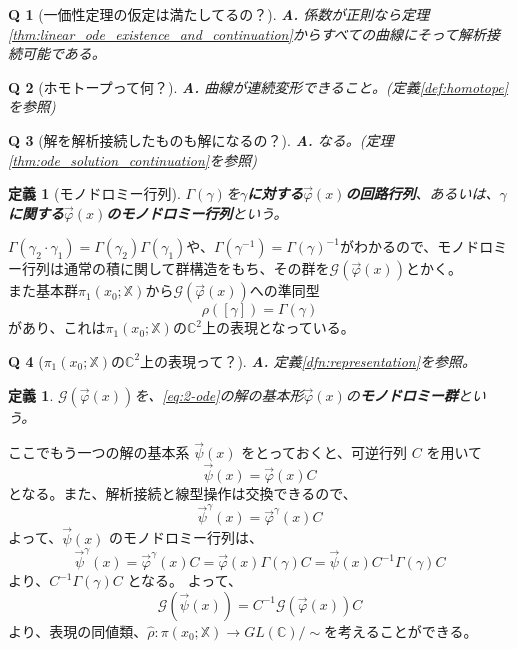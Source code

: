 \documentclass[paper=a4, fontsize=11pt]{jlreq} %
\theoremstyle{break}
\newtheorem{definition}[theorem]{定義}
\theoremstyle{qa}
\newtheorem*{Q}{Q}
\theoremstyle{remark} %
\begin{document}
\begin{Q}[一価性定理の仮定は満たしてるの？]
\textbf{A.} 係数が正則なら定理\ref{thm:linear_ode_existence_and_continuation}からすべての曲線にそって解析接続可能である。\\
\end{Q}

\begin{Q}[ホモトープって何？]
\textbf{A.} 曲線が連続変形できること。(定義\ref{def:homotope}を参照)\\
\end{Q}

\begin{Q}[解を解析接続したものも解になるの？]
\textbf{A.} なる。(定理\ref{thm:ode_solution_continuation}を参照)\\
\end{Q}

\begin{definition}[モノドロミー行列]
    $\Gamma(\gamma)$を\textbf{$\gamma$に対する$\vec{\varphi}(x)$の回路行列}、あるいは、\textbf{$\gamma$に関する$\vec{\varphi}(x)$のモノドロミー行列}という。
\end{definition}

$\Gamma(\gamma_{2}\cdot\gamma_{1})=\Gamma(\gamma_{2})\Gamma(\gamma_{1})$や、$\Gamma(\gamma^{-1})=\Gamma(\gamma)^{-1}$がわかるので、モノドロミー行列は通常の積に関して群構造をもち、その群を$\mathcal{G}(\vec{\varphi}(x))$とかく。\\
また基本群$\pi_1(x_{0};\mathbb{X})$から$\mathcal{G}(\vec{\varphi}(x))$への準同型
\[
\rho([\gamma])=\Gamma(\gamma)
\]
があり、これは$\pi_1(x_{0};\mathbb{X})$の$\mathbb{C}^{2}$上の表現となっている。

\begin{Q}[$\pi_1(x_{0};\mathbb{X})$の$\mathbb{C}^{2}$上の表現って？]
\textbf{A.} 定義\ref{dfn:representation}を参照。\\
\end{Q}

\begin{definition}
    $\mathcal{G}(\vec{\varphi}(x))$を、\eqref{eq:2-ode}の解の基本形$\vec{\varphi}(x)$の\textbf{モノドロミー群}という。
\end{definition}

ここでもう一つの解の基本系 $\vec{\psi}(x)$ をとっておくと、可逆行列 $C$ を用いて
\[
\vec{\psi}(x) = \vec{\varphi}(x)C
\]
となる。また、解析接続と線型操作は交換できるので、
\[
\vec{\psi}^{\gamma}(x) = \vec{\varphi}^{\gamma}(x)C
\]
よって、$\vec{\psi}(x)$ のモノドロミー行列は、
\begin{equation}\label{eq:monodromy_change_of_basis}
\vec{\psi}^{\gamma}(x) = \vec{\varphi}^{\gamma}(x)C= \vec{\varphi}(x)\Gamma(\gamma)C = \vec{\psi}(x)C^{-1}\Gamma(\gamma)C
\end{equation}
より、$C^{-1}\Gamma(\gamma)C$ となる。
よって、
\[
\mathcal{G}(\vec{\psi}(x))=C^{-1}\mathcal{G}(\vec{\varphi}(x))C
\]
より、表現の同値類、$\hat{\rho}:\pi(x_{0};\mathbb{X})\to GL(\mathbb{C})/\sim$を考えることができる。
\end{document}
